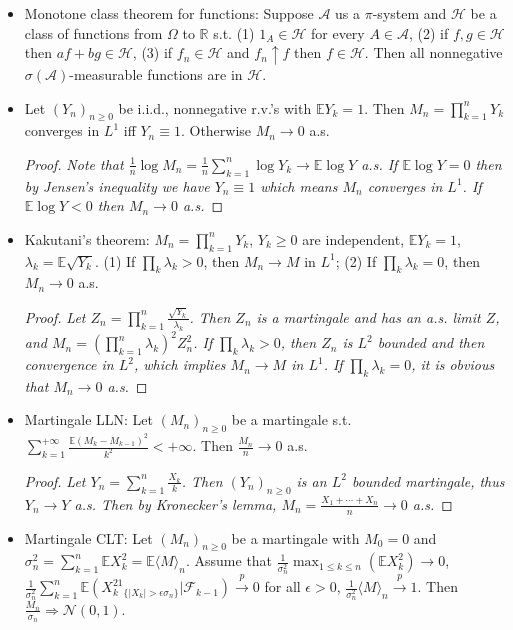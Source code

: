\documentclass[UTF8]{ctexart}
\theoremstyle{plain}
\theoremstyle{nonumberplain}
\newtheorem{proof}{\small\emph{Proof}}
\numberwithin{equation}{section} %
\newcommand{\RR}{\ensuremath{\mathbb{R}}}
\newcommand{\EE}{\mathbb{E}}
\newcommand{\scr}{\mathscr}
\renewcommand{\cal}{\mathcal}
\begin{document}
\begin{itemize}
  \item Monotone class theorem for functions: Suppose $\cal{A}$ us a $\pi$-system and $\cal{H}$ be a class of functions from $\Omega$ to $\RR$ s.t. (1) $1_A\in\cal{H}$ for every $A\in\scr{A}$, (2) if $f,g\in\cal{H}$ then $af+bg\in\cal{H}$, (3) if $f_n\in\cal{H}$ and $f_n\uparrow f$ then $f\in\cal{H}$. Then all nonnegative $\sigma(\cal{A})$-measurable functions are in $\cal{H}$.
  \item Let $(Y_n)_{n\geq 0}$ be i.i.d., nonnegative r.v.'s with $\EE Y_k=1$. Then $M_n=\prod_{k=1}^nY_k$ converges in $L^1$ iff $Y_n\equiv 1$. Otherwise $M_n\to 0$ a.s.
  \begin{proof}\small\emph{Note that $\frac{1}{n}\log M_n=\frac{1}{n}\sum_{k=1}^n\log Y_k\to\EE\log Y$ a.s. If $\EE\log Y=0$ then by Jensen's inequality we have $Y_n\equiv 1$ which means $M_n$ converges in $L^1$. If $\EE\log Y<0$ then $M_n\to 0$ a.s.}
  \end{proof}
  \item Kakutani's theorem: $M_n=\prod_{k=1}^nY_k$, $Y_k\geq 0$ are independent, $\EE Y_k=1$, $\lambda_k=\EE\sqrt{Y_k}$. (1) If $\prod_k\lambda_k>0$, then $M_n\to M$ in $L^1$; (2) If $\prod_k\lambda_k=0$, then $M_n\to 0$ a.s.
  \begin{proof}\small\emph{
    Let $Z_n=\prod_{k=1}^n\frac{\sqrt{Y_k}}{\lambda_k}$. Then $Z_n$ is a martingale and has an a.s. limit $Z$, and $M_n=(\prod_{k=1}^n\lambda_k)^2Z_n^2$. If $\prod_k\lambda_k>0$, then $Z_n$ is $L^2$ bounded and then convergence in $L^2$, which implies $M_n\to M$ in $L^1$. If $\prod_k\lambda_k=0$, it is obvious that $M_n\to 0$ a.s.}
  \end{proof}
  \item Martingale LLN: Let $(M_n)_{n\geq 0}$ be a martingale s.t. $\sum_{k=1}^{+\infty}\frac{\EE(M_k-M_{k-1})^2}{k^2}<+\infty$. Then $\frac{M_n}{n}\to 0$ a.s.
  \begin{proof}\small\emph{
    Let $Y_n=\sum_{k=1}^n\frac{X_k}{k}$. Then $(Y_n)_{n\geq 0}$ is an $L^2$ bounded martingale, thus $Y_n\to Y$ a.s. Then by Kronecker's lemma, $M_n=\frac{X_1+\cdots+X_n}{n}\to 0$ a.s.
  }
  \end{proof}
  \item Martingale CLT: Let $(M_n)_{n\geq 0}$ be a martingale with $M_0=0$ and $\sigma_n^2=\sum_{k=1}^n\EE X_k^2=\EE\langle M\rangle_n$. Assume that $\frac{1}{\sigma_n^2}\max_{1\leq k\leq n}(\EE X_k^2)\to 0$, $\frac{1}{\sigma_n^2}\sum_{k=1}^n\EE(X_k^21_{\{|X_k|>\epsilon\sigma_n\}}|\scr{F}_{k-1})\stackrel{p}{\to}0$ for all $\epsilon>0$, $\frac{1}{\sigma_n^2}\langle M\rangle_n\stackrel{p}{\to} 1$. Then $\frac{M_n}{\sigma_n}\Rightarrow\mathcal{N}(0,1)$.
\end{itemize}
\end{document}
